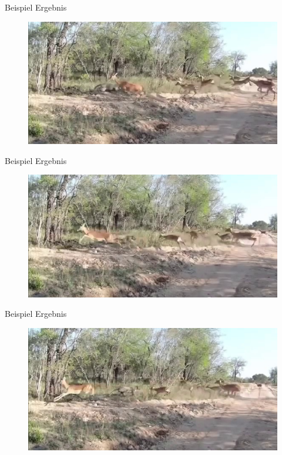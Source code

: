 \documentclass[hyperref={pdfpagelabels=false}]{beamer}
\begin{document}
\begin{frame}[t]{Beispiel Ergebnis}
	\vspace{1.3em}
	\begin{figure}
		\centering
		\includegraphics[width=0.8\linewidth]{Abbildungen/Einstieg/original_small6.jpg}
	\end{figure}
\end{frame}

\begin{frame}[t]{Beispiel Ergebnis}
	\vspace{1.3em}
	\begin{figure}
		\centering
		\includegraphics[width=0.8\linewidth]{Abbildungen/Einstieg/original_small7.jpg}
	\end{figure}
\end{frame}

\begin{frame}[t]{Beispiel Ergebnis}
	\vspace{1.3em}
	\begin{figure}
		\centering
		\includegraphics[width=0.8\linewidth]{Abbildungen/Einstieg/original_small9.jpg}
	\end{figure}
\end{frame}
\end{document}
